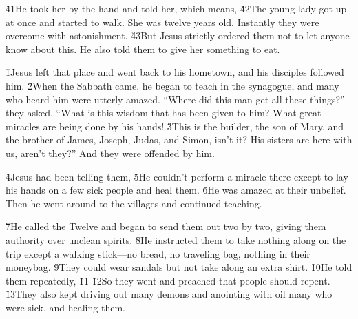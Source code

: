 \v{41}He took her by the hand and told her,  which means,  \v{42}The young lady got up at once and started to walk. She was twelve years old. Instantly they were overcome with astonishment. \v{43}But Jesus strictly ordered them not to let anyone know about this. He also told them to give her something to eat.

\v{1}Jesus left that place and went back to his hometown, and his disciples followed him. \v{2}When the Sabbath came, he began to teach in the synagogue, and many who heard him were utterly amazed. ``Where did this man get all these things?'' they asked. ``What is this wisdom that has been given to him? What great miracles are being done by his hands! \v{3}This is the builder, the son of Mary, and the brother of James, Joseph, Judas, and Simon, isn't it? His sisters are here with us, aren't they?'' And they were offended by him.

\v{4}Jesus had been telling them,  \v{5}He couldn't perform a miracle there except to lay his hands on a few sick people and heal them. \v{6}He was amazed at their unbelief. Then he went around to the villages and continued teaching.

\v{7}He called the Twelve and began to send them out two by two, giving them authority over unclean spirits. \v{8}He instructed them to take nothing along on the trip except a walking stick---no bread, no traveling bag, nothing in their moneybag. \v{9}They could wear sandals but not take along an extra shirt. \v{10}He told them repeatedly,  \v{11} \v{12}So they went and preached that people should repent. \v{13}They also kept driving out many demons and anointing with oil many who were sick, and healing them.

